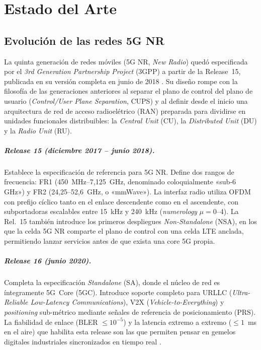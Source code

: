 \chapter{Estado del Arte}
\label{cap:capitulo2}

\section{Evolución de las redes 5G NR}
\label{sec:5g}

La quinta generación de redes móviles (5G NR, \textit{New Radio}) quedó especificada por
el \textit{3rd Generation Partnership Project} (3GPP) a partir de la Release~15, publicada
en su versión completa en junio de 2018 \cite{3gpp_rel15_2018}. Su diseño rompe con la
filosofía de las generaciones anteriores al separar el plano de control del plano de usuario
(\textit{Control/User Plane Separation}, CUPS) y al definir desde el inicio una arquitectura
de red de acceso radioelétrico (RAN) preparada para dividirse en unidades funcionales
distribuibles: la \textit{Central Unit} (CU), la \textit{Distributed Unit} (DU) y la
\textit{Radio Unit} (RU).

\paragraph{Release 15 (diciembre 2017 -- junio 2018).} Establece la especificación de
referencia para 5G NR. Define dos rangos de frecuencia: FR1 (450~MHz--7,125~GHz,
denominado coloquialmente «sub-6 GHz») y FR2 (24,25--52,6~GHz, o «mmWave»). La interfaz
radio utiliza OFDM con prefijo cíclico tanto en el enlace descendente como en el ascendente,
con subportadoras escalables entre 15~kHz y 240~kHz (\textit{numerology} $\mu = 0$--4).
La Rel.~15 también introduce los primeros despliegues \textit{Non-Standalone} (NSA), en los
que la celda 5G NR comparte el plano de control con una celda LTE anclada, permitiendo
lanzar servicios antes de que exista una core 5G propia.

\paragraph{Release 16 (junio 2020).} Completa la especificación \textit{Standalone} (SA),
donde el núcleo de red es íntegramente 5G~Core (5GC). Introduce soporte completo para
URLLC (\textit{Ultra-Reliable Low-Latency Communications}), V2X (\textit{Vehicle-to-Everything})
y \textit{positioning} sub-métrico mediante señales de referencia de posicionamiento (PRS).
La fiabilidad de enlace (BLER $\leq 10^{-5}$) y la latencia extremo a extremo ($\leq 1$~ms
en el aire) que habilita esta release son las que permiten pensar en gemelos digitales
industriales sincronizados en tiempo real \cite{3gpp_rel16_2020}.

